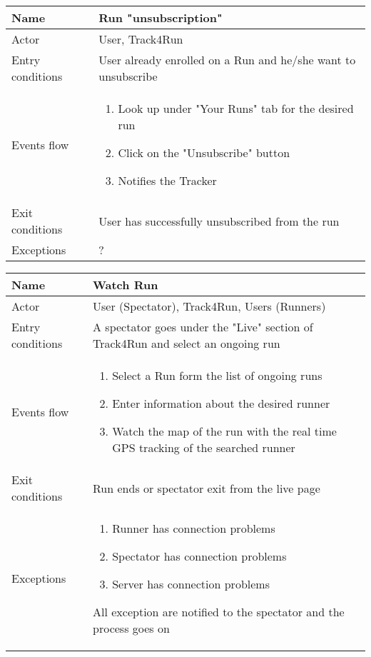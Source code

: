 \begin{table}[]
\begin{tabular}{|l|l|}
\hline
Name             & Run "unsubscription" \\ \hline
Actor            & User, Track4Run \\ \hline
Entry conditions & User already enrolled on a Run and he/she want to unsubscribe \\ \hline
Events flow      & \begin{enumerate}
\item Look up under "Your Runs" tab for the desired run
\item Click on the "Unsubscribe" button
\item Notifies the Tracker
\end{enumerate} \\ \hline
Exit conditions  & User has successfully unsubscribed from the run \\ \hline
Exceptions       & ? \\ \hline
\end{tabular}
\end{table}

\begin{table}[]
\begin{tabular}{|l|l|}
\hline
Name             & Watch Run \\ \hline
Actor            & User (Spectator), Track4Run, Users (Runners) \\ \hline
Entry conditions & A spectator goes under the "Live" section of Track4Run and select an ongoing run \\ \hline
Events flow      & \begin{enumerate}
\item Select a Run form the list of ongoing runs
\item Enter information about the desired runner
\item Watch the map of the run with the real time GPS tracking of the searched runner
\end{enumerate} \\ \hline
Exit conditions  & Run ends or spectator exit from the live page \\ \hline
Exceptions       & \begin{enumerate}
\item Runner has connection problems
\item Spectator has connection problems
\item Server has connection problems
\end{enumerate} All exception are notified to the spectator and the process goes on\\ \hline
\end{tabular}
\end{table}

